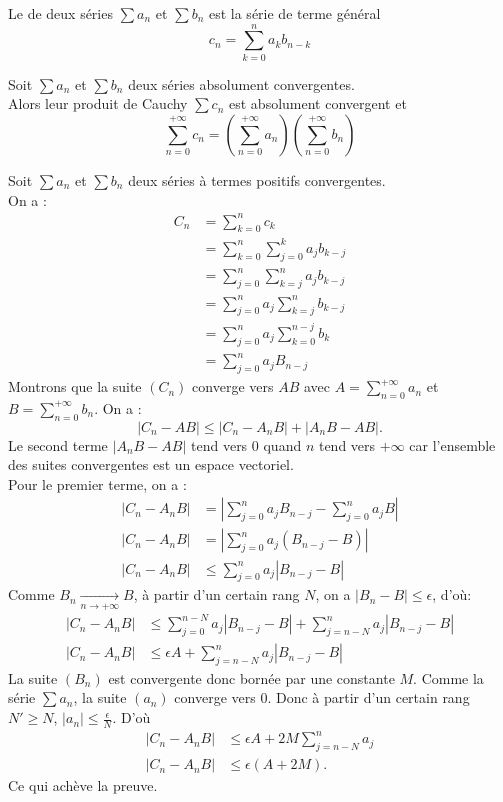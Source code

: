 \documentclass{book}
\begin{document}
\begin{Definition}
Le  de deux séries $\sum a_{n}$  et $\sum b_{n}$ est la série de terme général 
$$ c_{n}=\sum _{k=0}^{n}a_{k}b_{n-k} $$
\end{Definition}
\begin{Theoreme}
Soit $\sum a_n$ et $\sum b_n$ deux séries absolument convergentes.\\
Alors  leur produit de Cauchy $\sum c_n$ est absolument convergent et 
$$ \sum_{n=0}^{+\infty} c_n = \left(\sum_{n=0}^{+\infty} a_n \right) \left(\sum_{n=0}^{+\infty} b_n \right)$$
\end{Theoreme}
\begin{Demonstration}
Soit $\sum a_n$ et $\sum b_n$ deux séries à termes positifs convergentes.\\
On a :
$$\begin{aligned}
C_{n}&=\sum _{k=0}^n c_{k}\\
     &=\sum _{k=0}^n \sum_{j=0}^k a_j b_{k-j} \\
     &=\sum _{j=0}^n \sum_{k=j}^n a_j b_{k-j} \\
     &=\sum _{j=0}^n a_j \sum_{k=j}^n  b_{k-j} \\
     &=\sum _{j=0}^n a_j \sum_{k=0}^{n-j}  b_{k} \\
     &=\sum _{j=0}^n a_j B_{n-j}
\end{aligned}$$
Montrons que la suite $(C_n)$ converge vers $AB$ avec $A=\sum_{n=0}^{+\infty} a_n$ et $B=\sum_{n=0}^{+\infty} b_n$.
On a :
$$|C_n - AB|\leq  |C_n - A_n B| + | A_n B- AB |.$$
Le second terme $| A_n B- AB |$ tend vers $0$ quand $n$ tend vers $+\infty$ car l'ensemble des suites convergentes est un espace vectoriel.\\
Pour le premier terme, on a :
$$\begin{aligned}
|C_n - A_n B|&=|\sum _{j=0}^n a_j B_{n-j} - \sum _{j=0}^n a_j B|\\
|C_n - A_n B|&=|\sum _{j=0}^n a_j (B_{n-j}-B) |\\
|C_n - A_n B|&\leq \sum _{j=0}^n a_j |B_{n-j}-B|
\end{aligned}$$
Comme $B_n\xrightarrow[n \to +\infty]{} B$, à partir d'un certain rang $N$, on a $|B_n-B|\leq\epsilon$, d'où:
$$\begin{aligned}
|C_n - A_n B|&\leq \sum _{j=0}^{n-N} a_j |B_{n-j}-B| + \sum _{j=n-N}^{n} a_j |B_{n-j}-B|\\
|C_n - A_n B|&\leq \epsilon A + \sum _{j=n-N}^{n} a_j |B_{n-j}-B|
\end{aligned}$$
La suite $(B_n)$ est convergente donc bornée par une constante $M$. Comme la série $\sum a_n$, la suite $(a_n)$ converge vers 0. Donc à partir d'un certain rang $N'\geq N$, $|a_n|\leq \frac{\epsilon}{N}$. D'où
$$\begin{aligned} 
|C_n - A_n B|&\leq \epsilon A + 2 M \sum _{j=n-N}^{n} a_j\\
|C_n - A_n B|&\leq  \epsilon (A+2M).
\end{aligned}$$
Ce qui achève la preuve.
\end{Demonstration}
\end{document}
